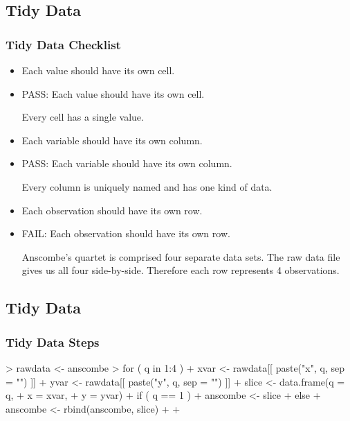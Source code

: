 \documentclass{beamer}
\begin{document}
\subsection{Tidy Data}
\begin{frame}[fragile]
\frametitle{Tidy Data Checklist}

\begin{itemize}
\item<1-1> Each value should have its own cell.
\item<2-> PASS: Each value  should have its own cell. \par Every cell has a single value.
\item<3-3> Each variable should have its own column.
\item<4-> PASS: Each variable should have its own column. \par Every column is uniquely named and has one kind of data.
\item<5-5> Each observation should have its own row.
\item<6-> FAIL: Each observation should have its own row. \par Anscombe's quartet is comprised four separate data sets. The raw data file gives us all four side-by-side. Therefore each row represents 4 observations.
\end{itemize}

\end{frame}

  

\subsection{Tidy Data}
\begin{frame}[fragile]
\frametitle{Tidy Data Steps}

\begin{Schunk}
\begin{Sinput}
> rawdata <- anscombe
> for ( q in 1:4 ) {
+     xvar <- rawdata[[ paste("x", q, sep = "") ]]
+     yvar <- rawdata[[ paste("y", q, sep = "") ]]
+     slice <- data.frame(q = q,
+                         x = xvar,
+                         y = yvar)
+     if ( q == 1 ) {
+         anscombe <- slice
+     } else {
+         anscombe <- rbind(anscombe, slice)
+     }
+ } 
\end{Sinput}
\end{Schunk}

\end{frame}
\end{document}
